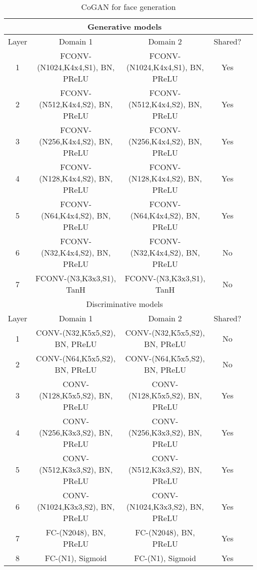 \begin{table*}[thb!]
\small
\centering
{
\caption{CoGAN for face generation}
\label{tbl::face_g}
\begin{tabular}{|c|c|c|c|c|}
\hline
\multicolumn{4}{|c|}{Generative models}\\
\hline\rule{0pt}{2ex}    
Layer &  Domain 1 & Domain 2 & Shared? \\
\hline 
1 &  FCONV-(N1024,K4x4,S1), BN, PReLU & FCONV-(N1024,K4x4,S1), BN, PReLU & Yes\\
2 &  FCONV-(N512,K4x4,S2), BN, PReLU & FCONV-(N512,K4x4,S2), BN, PReLU & Yes\\
3 &  FCONV-(N256,K4x4,S2), BN, PReLU & FCONV-(N256,K4x4,S2), BN, PReLU & Yes\\
4 &  FCONV-(N128,K4x4,S2), BN, PReLU & FCONV-(N128,K4x4,S2), BN, PReLU & Yes\\
5 &  FCONV-(N64,K4x4,S2), BN, PReLU & FCONV-(N64,K4x4,S2), BN, PReLU & Yes\\
6 &  FCONV-(N32,K4x4,S2), BN, PReLU & FCONV-(N32,K4x4,S2), BN, PReLU & No\\
7 &  FCONV-(N3,K3x3,S1), TanH & FCONV-(N3,K3x3,S1), TanH & No\\
\hline
\hline
\multicolumn{4}{|c|}{Discriminative models}\\
\hline\rule{0pt}{2ex} 
Layer &  Domain 1 & Domain 2 & Shared? \\
\hline
1 & CONV-(N32,K5x5,S2), BN, PReLU & CONV-(N32,K5x5,S2), BN, PReLU &No\\
2 & CONV-(N64,K5x5,S2), BN, PReLU & CONV-(N64,K5x5,S2), BN, PReLU &No\\
3 & CONV-(N128,K5x5,S2), BN, PReLU & CONV-(N128,K5x5,S2), BN, PReLU &Yes\\
4 & CONV-(N256,K3x3,S2), BN, PReLU & CONV-(N256,K3x3,S2), BN, PReLU &Yes\\
5 & CONV-(N512,K3x3,S2), BN, PReLU & CONV-(N512,K3x3,S2), BN, PReLU &Yes\\
6 & CONV-(N1024,K3x3,S2), BN, PReLU & CONV-(N1024,K3x3,S2), BN, PReLU &Yes\\
7 & FC-(N2048), BN, PReLU & FC-(N2048), BN, PReLU &Yes\\
8 & FC-(N1), Sigmoid & FC-(N1), Sigmoid &Yes\\
\hline
\end{tabular}
}
\end{table*}


